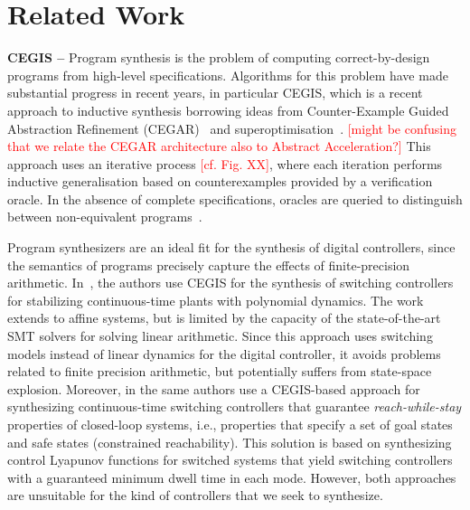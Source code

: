 \documentclass[twocolumn]{autart}    %
\renewcommand{\note}[1]{\textcolor{red}{[#1]}}
\begin{document}
\section{Related Work}
\label{sec:relw}

\textbf{CEGIS --} Program synthesis is the problem of computing
correct-by-design programs from high-level specifications. Algorithms
for this problem have made substantial progress in recent years, in
particular CEGIS, which is a recent approach to inductive synthesis
borrowing ideas from Counter-Example Guided Abstraction Refinement
(CEGAR)~\cite{DBLP:conf/cav/ClarkeGJLV00} and
superoptimisation~\cite{DBLP:conf/iclp/BrainCVF06,
  DBLP:conf/asplosss/Massalin87}.  
\note{might be confusing that we relate the CEGAR architecture also to Abstract Acceleration?}   
This approach uses an iterative
process \note{cf. Fig. XX}, where each iteration performs inductive generalisation based
on counterexamples provided by a verification oracle.  In the absence
of complete specifications, oracles are queried to distinguish between
non-equivalent
programs~\cite{jha-icse10,DBLP:conf/fmcad/AlurBJMRSSSTU13}.


Program synthesizers are an ideal fit for the synthesis of digital controllers, since
the semantics of programs precisely capture the effects of finite-precision arithmetic.  
In~\cite{DBLP:conf/cdc/RavanbakhshS15}, the authors use CEGIS 
for the synthesis of switching controllers for stabilizing continuous-time
plants with polynomial dynamics.  The work extends to affine systems, but is
limited by the capacity of the state-of-the-art SMT solvers for solving
linear arithmetic.  Since this approach uses switching models instead of
linear dynamics for the digital controller, it avoids problems related to
finite precision arithmetic, but potentially suffers from state-space
explosion.  Moreover, in \cite{DBLP:conf/emsoft/RavanbakhshS16} the same
authors use a CEGIS-based approach for synthesizing continuous-time
switching controllers that guarantee \emph{reach-while-stay} properties of
closed-loop systems, i.e., properties that specify a set of goal states and
safe states (constrained reachability).  This solution is based on
synthesizing control Lyapunov functions for switched systems that yield
switching controllers with a guaranteed minimum dwell time in each mode. 
However, both approaches are unsuitable for the kind of controllers that we seek to
synthesize.
\end{document}
